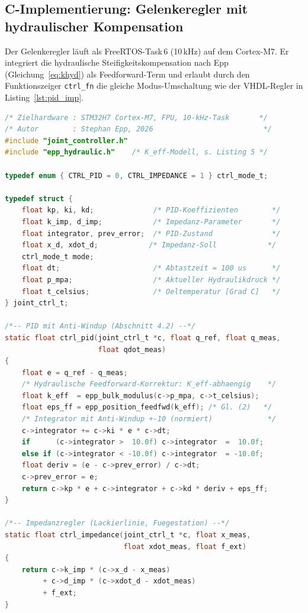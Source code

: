 ﻿\documentclass[a4paper,12pt]{scrreprt}
\theoremstyle{definition}
\begin{document}
\subsection{C-Implementierung: Gelenkeregler mit hydraulischer Kompensation}

Der Gelenkeregler läuft als FreeRTOS-Task\,6 (10\,kHz) auf dem
Cortex-M7. Er integriert die hydraulische Steifigkeitskompensation
nach Epp (Gleichung~\ref{eq:khyd}) als Feedforward-Term und erlaubt
durch den Funktionszeiger \texttt{ctrl\_fn} die gleiche
Modus-Umschaltung wie der VHDL-Regler in Listing~\ref{lst:pid_imp}.

\begin{lstlisting}[language=C,
  caption={joint\_controller.c -- PID/Impedanz-Gelenkeregler
    mit hydraulischem Epp-Feedforward auf STM32H7 Cortex-M7 (10 kHz).},
  label={lst:joint_ctrl}]
/* Zielhardware : STM32H7 Cortex-M7, FPU, 10-kHz-Task       */
/* Autor        : Stephan Epp, 2026                          */
#include "joint_controller.h"
#include "epp_hydraulic.h"    /* K_eff-Modell, s. Listing 5 */

typedef enum { CTRL_PID = 0, CTRL_IMPEDANCE = 1 } ctrl_mode_t;

typedef struct {
    float kp, ki, kd;              /* PID-Koeffizienten        */
    float k_imp, d_imp;            /* Impedanz-Parameter       */
    float integrator, prev_error;  /* PID-Zustand              */
    float x_d, xdot_d;            /* Impedanz-Soll            */
    ctrl_mode_t mode;
    float dt;                      /* Abtastzeit = 100 us      */
    float p_mpa;                   /* Aktueller Hydraulikdruck */
    float t_celsius;               /* Oeltemperatur [Grad C]   */
} joint_ctrl_t;

/*-- PID mit Anti-Windup (Abschnitt 4.2) --*/
static float ctrl_pid(joint_ctrl_t *c, float q_ref, float q_meas,
                      float qdot_meas)
{
    float e = q_ref - q_meas;
    /* Hydraulische Feedforward-Korrektur: K_eff-abhaengig    */
    float k_eff  = epp_bulk_modulus(c->p_mpa, c->t_celsius);
    float eps_ff = epp_position_feedfwd(k_eff); /* Gl. (2)   */
    /* Integrator mit Anti-Windup +-10 (normiert)             */
    c->integrator += c->ki * e * c->dt;
    if      (c->integrator >  10.0f) c->integrator  =  10.0f;
    else if (c->integrator < -10.0f) c->integrator  = -10.0f;
    float deriv = (e - c->prev_error) / c->dt;
    c->prev_error = e;
    return c->kp * e + c->integrator + c->kd * deriv + eps_ff;
}

/*-- Impedanzregler (Lackierlinie, Fuegestation) --*/
static float ctrl_impedance(joint_ctrl_t *c, float x_meas,
                            float xdot_meas, float f_ext)
{
    return c->k_imp * (c->x_d - x_meas)
         + c->d_imp * (c->xdot_d - xdot_meas)
         + f_ext;
}


\end{lstlisting}
\end{document}
